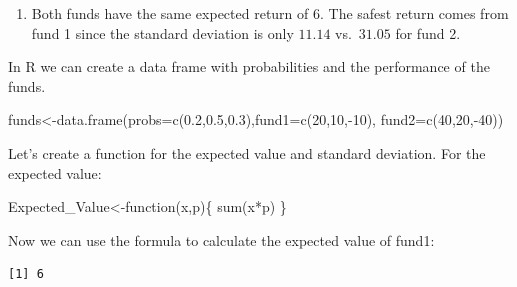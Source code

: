 \documentclass[
  letterpaper,
  DIV=11,
  numbers=noendperiod]{scrreprt}
\newenvironment{Shaded}{\begin{snugshade}}{\end{snugshade}}
\newcommand{\AttributeTok}[1]{\textcolor[rgb]{0.40,0.45,0.13}{#1}}
\newcommand{\ControlFlowTok}[1]{\textcolor[rgb]{0.00,0.23,0.31}{#1}}
\newcommand{\DecValTok}[1]{\textcolor[rgb]{0.68,0.00,0.00}{#1}}
\newcommand{\FloatTok}[1]{\textcolor[rgb]{0.68,0.00,0.00}{#1}}
\newcommand{\FunctionTok}[1]{\textcolor[rgb]{0.28,0.35,0.67}{#1}}
\newcommand{\NormalTok}[1]{\textcolor[rgb]{0.00,0.23,0.31}{#1}}
\newcommand{\OtherTok}[1]{\textcolor[rgb]{0.00,0.23,0.31}{#1}}
\newcommand{\SpecialCharTok}[1]{\textcolor[rgb]{0.37,0.37,0.37}{#1}}
\providecommand{\tightlist}{%
  \setlength{\itemsep}{0pt}\setlength{\parskip}{0pt}}\usepackage{longtable,booktabs,array}
\begin{document}
\begin{enumerate}
\def\labelenumi{\arabic{enumi}.}
\setcounter{enumi}{2}
\tightlist
\item
  Both funds have the same expected return of \(6\). The safest return
  comes from fund 1 since the standard deviation is only \(11.14\)
  vs.~\(31.05\) for fund 2.
\end{enumerate}

In R we can create a data frame with probabilities and the performance
of the funds.

\begin{Shaded}
\begin{Highlighting}[numbers=left,,]
\NormalTok{funds}\OtherTok{\textless{}{-}}\FunctionTok{data.frame}\NormalTok{(}\AttributeTok{probs=}\FunctionTok{c}\NormalTok{(}\FloatTok{0.2}\NormalTok{,}\FloatTok{0.5}\NormalTok{,}\FloatTok{0.3}\NormalTok{),}\AttributeTok{fund1=}\FunctionTok{c}\NormalTok{(}\DecValTok{20}\NormalTok{,}\DecValTok{10}\NormalTok{,}\SpecialCharTok{{-}}\DecValTok{10}\NormalTok{), }\AttributeTok{fund2=}\FunctionTok{c}\NormalTok{(}\DecValTok{40}\NormalTok{,}\DecValTok{20}\NormalTok{,}\SpecialCharTok{{-}}\DecValTok{40}\NormalTok{))}
\end{Highlighting}
\end{Shaded}

Let's create a function for the expected value and standard deviation.
For the expected value:

\begin{Shaded}
\begin{Highlighting}[numbers=left,,]
\NormalTok{Expected\_Value}\OtherTok{\textless{}{-}}\ControlFlowTok{function}\NormalTok{(x,p)\{}
  \FunctionTok{sum}\NormalTok{(x}\SpecialCharTok{*}\NormalTok{p)}
\NormalTok{\}}
\end{Highlighting}
\end{Shaded}

Now we can use the formula to calculate the expected value of fund1:

\begin{Shaded}
\end{Shaded}

\begin{verbatim}
[1] 6
\end{verbatim}
\end{document}
